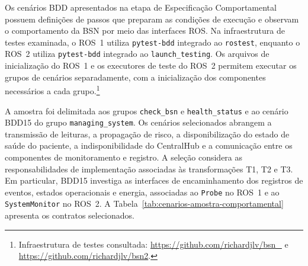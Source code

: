 Os cenários BDD apresentados na etapa de Especificação Comportamental possuem definições de passos que preparam as condições de execução e observam o comportamento da BSN por meio das interfaces ROS. Na infraestrutura de testes examinada, o ROS~1 utiliza \texttt{pytest-bdd} integrado ao \texttt{rostest}, enquanto o ROS~2 utiliza \texttt{pytest-bdd} integrado ao \texttt{launch\_testing}. Os arquivos de inicialização do ROS~1 e os executores de teste do ROS~2 permitem executar os grupos de cenários separadamente, com a inicialização dos componentes necessários a cada grupo.\footnote{Infraestrutura de testes consultada: \url{https://github.com/richardjlv/bsn_} e \url{https://github.com/richardjlv/bsn2}.}


A amostra foi delimitada aos grupos \texttt{check\_bsn} e \texttt{health\_status} e ao cenário BDD15 do grupo \texttt{managing\_system}. Os cenários selecionados abrangem a transmissão de leituras, a propagação de risco, a disponibilização do estado de saúde do paciente, a indisponibilidade do CentralHub e a comunicação entre os componentes de monitoramento e registro. A seleção considera as responsabilidades de implementação associadas às transformações T1, T2 e T3. Em particular, BDD15 investiga as interfaces de encaminhamento dos registros de eventos, estados operacionais e energia, associadas ao \texttt{Probe} no ROS~1 e ao \texttt{SystemMonitor} no ROS~2. A Tabela~\ref{tab:cenarios-amostra-comportamental} apresenta os contratos selecionados.

